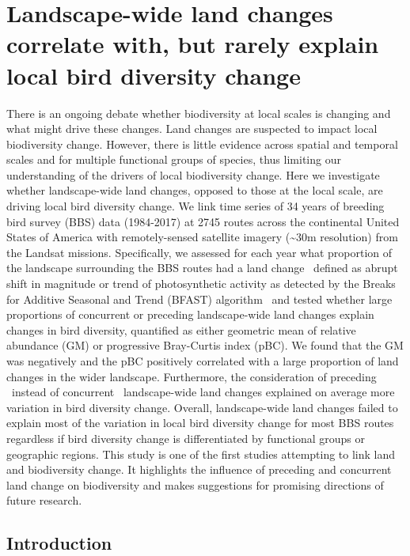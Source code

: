 \chapter{Landscape-wide land changes correlate with, but rarely explain local bird diversity change}
\label{C05}

There is an ongoing debate whether biodiversity at local scales is changing and what might drive these changes. Land changes are suspected to impact local biodiversity change. However, there is little evidence across spatial and temporal scales and for multiple functional groups of species, thus limiting our understanding of the drivers of local biodiversity change. Here we investigate whether landscape-wide land changes, opposed to those at the local scale, are driving local bird diversity change. We link time series of 34 years of breeding bird survey (BBS) data (1984-2017) at 2745 routes across the continental United States of America with remotely-sensed satellite imagery (\textasciitilde30m resolution) from the Landsat missions. Specifically, we assessed for each year what proportion of the landscape surrounding the BBS routes had a land change \textendash\ defined as abrupt shift in magnitude or trend of photosynthetic activity as detected by the Breaks for Additive Seasonal and Trend (BFAST) algorithm \textendash\ and tested whether large proportions of concurrent or preceding landscape-wide land changes explain changes in bird diversity, quantified as either geometric mean of relative abundance (GM) or progressive Bray-Curtis index (pBC). We found that the GM was negatively and the pBC positively correlated with a large proportion of land changes in the wider landscape. Furthermore, the consideration of preceding \textendash\ instead of concurrent \textendash\ landscape-wide land changes explained on average more variation in bird diversity change. Overall, landscape-wide land changes failed to explain most of the variation in local bird diversity change for most BBS routes regardless if bird diversity change is differentiated by functional groups or geographic regions. This study is one of the first studies attempting to link land and biodiversity change. It highlights the influence of preceding and concurrent land change on biodiversity and makes suggestions for promising directions of future research.  

\section{Introduction}
\label{C05_01}

